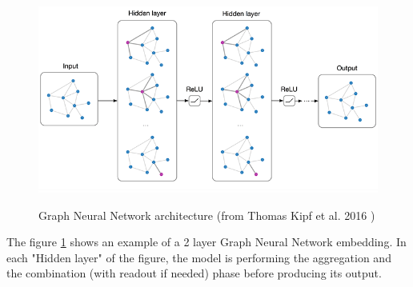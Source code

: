 \begin{figure}[H]
\centering
\includegraphics[scale=0.45]{./img/kipf-2.png}\\[2cm] 
\caption{Graph Neural Network architecture (from  Thomas Kipf et al. 2016 \cite{gcn}) }\label{fig:GNN_schema}
\end{figure}

The figure \ref{fig:GNN_schema} shows an example of a 2 layer Graph Neural Network embedding. In each "Hidden layer" of the figure, the model is performing the aggregation and the combination (with readout if needed) phase before producing its output.
 







